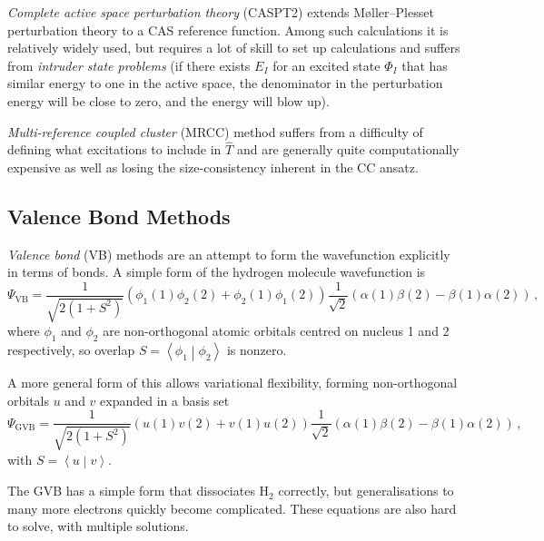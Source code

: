 \documentclass{article}
\theoremstyle{plain}\theoremheaderfont{\normalfont\itshape}\theorembodyfont{\rmfamily}\theoremseparator{.}\newtheorem*{rem}{Remark}\newtheorem*{ex}{Example}\newtheorem*{proof}{Proof}\newtheorem*{altp}{Alternative proof}
\theoremstyle{plain}\theoremheaderfont{\normalfont\bfseries}\theorembodyfont{\rmfamily}\theoremseparator{.}\newtheorem{thm}{Theorem}[section]\newtheorem{lem}[thm]{Lemma}\newtheorem{prop}[thm]{Proposition}\newtheorem*{cor}{Corollary}\newtheorem{defn}[thm]{Definition}\newtheorem{clm}[thm]{Claim}\newtheorem{clminproof}{Claim}
\theoremstyle{break}\theoremheaderfont{\normalfont\itshape}\theorembodyfont{\rmfamily}\theoremseparator{.\medskip}\newtheorem*{proofskip}{Proof}\newtheorem*{exs}{Examples}\newtheorem*{rems}{Remarks}
\theoremstyle{break}\theoremheaderfont{\normalfont\bfseries}\theorembodyfont{\rmfamily}\theoremseparator{.\medskip}\newtheorem{lemskip}[thm]{Lemma}\newtheorem{defnskip}[thm]{Definition}\newtheorem{propskip}[thm]{Proposition}\newtheorem{thmskip}[thm]{Theorem}
\numberwithin{equation}{section}
\newcommand{\braket}[2]{\left\langle #1 \middle| #2 \right\rangle}
\begin{document}
    \textit{Complete active space perturbation theory} (CASPT2) extends M\o ller--Plesset perturbation theory to a CAS reference function. Among such calculations it is relatively widely used, but requires a lot of skill to set up calculations and suffers from \textit{intruder state problems} (if there exists \(E_I\) for an excited state \(\Phi_I\) that has similar energy to one in the active space, the denominator in the perturbation energy will be close to zero, and the energy will blow up).

    \textit{Multi-reference coupled cluster} (MRCC) method suffers from a difficulty of defining what excitations to include in \(\hat{T}\) and are generally quite computationally expensive as well as losing the size-consistency inherent in the CC ansatz.
    
    \subsection{Valence Bond Methods}
    \textit{Valence bond} (VB) methods are an attempt to form the wavefunction explicitly in terms of bonds. A simple form of the hydrogen molecule wavefunction is
    \begin{equation}
        \Psi_{\text{VB}}=\frac{1}{\sqrt{2(1+S^2)}}(\phi_1(1)\phi_2(2)+\phi_2(1)\phi_1(2))\frac{1}{\sqrt{2}}(\alpha(1)\beta(2)-\beta(1)\alpha(2))\,,
    \end{equation}
    where \(\phi_1\) and \(\phi_2\) are non-orthogonal atomic orbitals centred on nucleus 1 and 2 respectively, so overlap \(S=\braket{\phi_1}{\phi_2}\) is nonzero.

    A more general form of this allows variational flexibility, forming non-orthogonal orbitals \(u\) and \(v\) expanded in a basis set
    \begin{equation}
        \Psi_{\text{GVB}}=\frac{1}{\sqrt{2(1+S^2)}}(u(1)v(2)+v(1)u(2))\frac{1}{\sqrt{2}}(\alpha(1)\beta(2)-\beta(1)\alpha(2))\,,
    \end{equation}
    with \(S=\braket{u}{v}\).

    The GVB has a simple form that dissociates H\(_2\) correctly, but generalisations to many more electrons quickly become complicated. These equations are also hard to solve, with multiple solutions.
\end{document}
